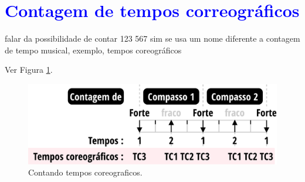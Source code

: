 \section{\textcolor{blue}{Contagem de tempos correográficos}}
\label{sec:TemposCoreograficos}

falar da possibilidade de contar 123 567 sim se usa um nome diferente a contagem de tempo musical,
exemplo, tempos coreográficos

Ver Figura \ref{fig:contagemtempocoreografico}.
\begin{figure}
    \centering
    \includegraphics[width=\textwidth]{chapters/cap-musicalidade/contagemtempocoreografico.eps}
    \caption{Contando tempos coreograficos.}
    \label{fig:contagemtempocoreografico}
\end{figure}

